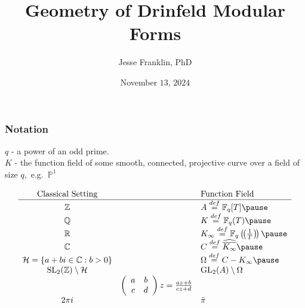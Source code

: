 \documentclass[handout]{beamer}
\title{Geometry of Drinfeld Modular Forms}
\author{Jesse Franklin, PhD}
\institute{Salt Lake Community College}
\date{November $13$, $2024$}
\numberwithin{equation}{section}
\numberwithin{case}{theorem}
\newcommand{\cH}{\mathcal{H}}		%
\newcommand{\bbC}{\mathbb{C}}		%
\newcommand{\bbF}{\mathbb{F}}		%
\newcommand{\bbP}{\mathbb{P}}		%
\newcommand{\bbQ}{\mathbb{Q}}		%
\newcommand{\bbR}{\mathbb{R}}		%
\newcommand{\bbZ}{\mathbb{Z}}		%
\newcommand{\GL}{\mathrm{GL}} 	%
\newcommand{\SL}{\mathrm{SL}} 	%
\newcommand{\<}{\left\langle}
\renewcommand{\>}{\right\rangle}
\begin{document}
	
	\frame{\titlepage}
	
	\begin{frame}
		\frametitle{Notation}
		$q$ - a power of an odd prime.\\ 
		$K$ - the function field of some smooth, connected, projective curve over a field of size $q,$ \pause  e.g.\ $\bbP^1$
		
		\[\begin{array}{ccl}
			\text{Classical Setting} && \text{Function Field}\\
			\hline
			\bbZ && A\overset{def}{=}\bbF_q[T]\pause\\
			\bbQ && K \overset{def}{=} \bbF_q(T)\pause\\
			\bbR && K_{\infty}\overset{def}{=}\bbF_q\left(\!\left(\frac{1}{T}\right)\!\right) \pause\\
			\bbC && C \overset{def}{=} \widehat{\overline{K_{\infty}}}\pause\\
			\cH = \{a+bi\in \bbC:b>0\} && \Omega \overset{def}{=} C-K_{\infty}\pause\\
			\SL_2(\bbZ)\setminus\cH && \GL_2(A)\setminus \Omega\\
			&\left(\begin{array}{cc}a&b\\c&d\end{array}\right)z=\frac{az+b}{cz+d}&\\
			2\pi i&&\bar{\pi}
		\end{array}\]
	\end{frame}
	
\end{document}
